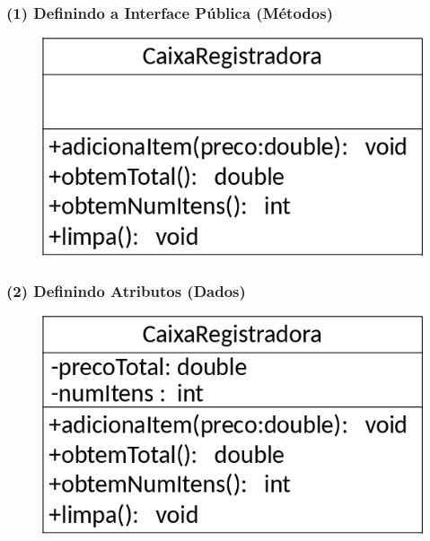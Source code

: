 \documentclass[aspectratio=169]{beamer}
\begin{document}
\begin{frame}\frametitle{(1) Definindo a Interface Pública (Métodos)}
\begin{figure}[h]
	\centering
	\includegraphics[height=0.5\paperheight]{pucrs-ec-poo-unidade_04-classes_e_objetos-laminas-caixa_registradora1.png}
\end{figure}
\end{frame}

\begin{frame}\frametitle{(2) Definindo Atributos (Dados)}
\begin{figure}[h]
	\centering
	\includegraphics[height=0.5\paperheight]{pucrs-ec-poo-unidade_04-classes_e_objetos-laminas-caixa_registradora2.png}
\end{figure}
\end{frame}
\end{document}
